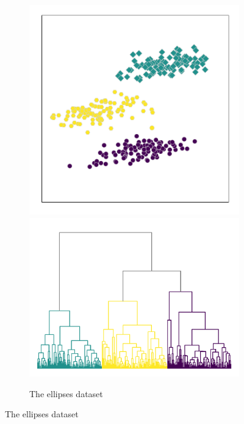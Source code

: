\begin{figure}
    \begin{subfigure}{\textwidth}
        \centering
        \includegraphics[height=\hierheight]{hierarchical/ellipses}
        \includegraphics[height=\hierheight]{dendogram/ellipses}
        \caption{The ellipses dataset}\label{fig:hierarchical_ellipses}
    \end{subfigure}%


\end{figure}
